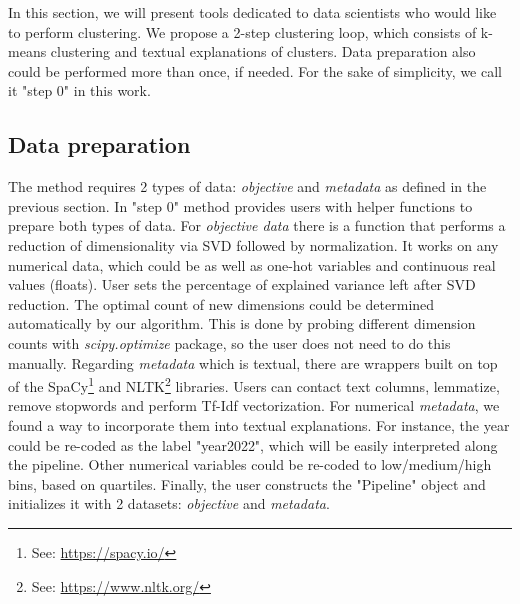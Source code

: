 \documentclass{article}
\begin{document}
In this section, we will present tools dedicated to data scientists who would like to perform clustering.
We propose a 2-step clustering loop, which consists of k-means clustering and textual explanations of clusters.
Data preparation also could be performed more than once, if needed.
For the sake of simplicity, we call it "step 0" in this work.

\subsection{Data preparation}\label{subsec:data-preparation}
The method requires 2 types of data: \textit{objective} and \textit{metadata} as defined in the previous section.
In "step 0" method provides users with helper functions to prepare both types of data.
For \textit{objective data} there is a function that performs a reduction of dimensionality via SVD followed by normalization.
It works on any numerical data, which could be as well as one-hot variables and continuous real values (floats).
User sets the percentage of explained variance left after SVD reduction.
The optimal count of new dimensions could be determined automatically by our algorithm.
This is done by probing different dimension counts with \textit{scipy.optimize} package, so the user does not need to do this manually.
Regarding \textit{metadata} which is textual, there are wrappers built on top of the SpaCy\footnote{See: \url{https://spacy.io/}} and NLTK\footnote{See: \url{https://www.nltk.org/}} libraries.
Users can contact text columns, lemmatize, remove stopwords and perform Tf-Idf vectorization.
For numerical \textit{metadata}, we found a way to incorporate them into textual explanations.
For instance, the year could be re-coded as the label "year2022", which will be easily interpreted along the pipeline.
Other numerical variables could be re-coded to low/medium/high bins, based on quartiles.
Finally, the user constructs the "Pipeline" object and initializes it with 2 datasets: \textit{objective} and \textit{metadata}.
\end{document}
